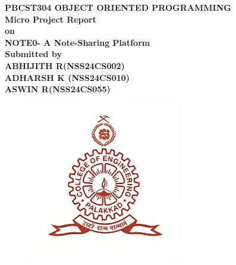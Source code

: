 \documentclass[12pt, a4paper]{report}
\begin{document}
    
    
    
    
    


\begin{center}
\textbf{PBCST304 OBJECT ORIENTED PROGRAMMING}\\[0.3cm]
\textbf{Micro Project Report}\\[0.3cm]
\textbf{on}\\[0.3cm]
\textbf{NOTE0- A  Note-Sharing Platform}\\[0.8cm]
\textbf{Submitted by}\\[0.3cm]
\textbf{ABHIJITH R(NSS24CS002)}\\[0.5cm]
\textbf{ADHARSH K (NSS24CS010)}\\[.5cm]
\textbf{ASWIN R(NSS24CS055)}\\[.5cm]
\end{center}
\date{Analysis Date: APRIL 21, 2025}
\begin{figure}[h] %
  \centering
  \includegraphics[width=0.6\textwidth]{images/NSS_LOGO.jpg} %
   
  
\end{figure}
\end{document}
